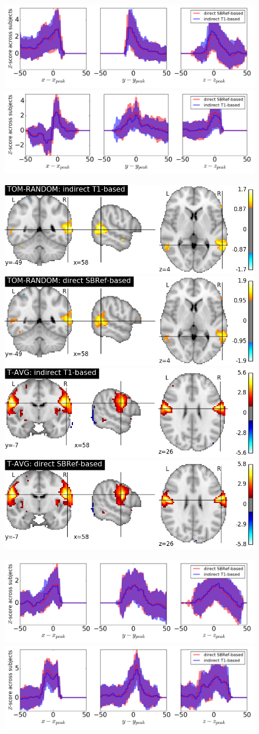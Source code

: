 \begin{figure}[!htbp]
\includegraphics[width=.48\linewidth]{figures/FACES-SHAPES_blobs.png}
\includegraphics[width=.48\linewidth]{figures/LF-RF_blobs.png}


\includegraphics[width=.235\linewidth]{figures/TOM-RANDOM_DC+T1.png}
\includegraphics[width=.235\linewidth]{figures/TOM-RANDOM_DC+SBRef.png}
\includegraphics[width=.235\linewidth]{figures/T-AVG_DC+T1.png}
\includegraphics[width=.235\linewidth]{figures/T-AVG_DC+SBRef.png}

\includegraphics[width=.48\linewidth]{figures/TOM-RANDOM_blobs.png}
\includegraphics[width=.48\linewidth]{figures/T-AVG_blobs.png}


\end{figure}
